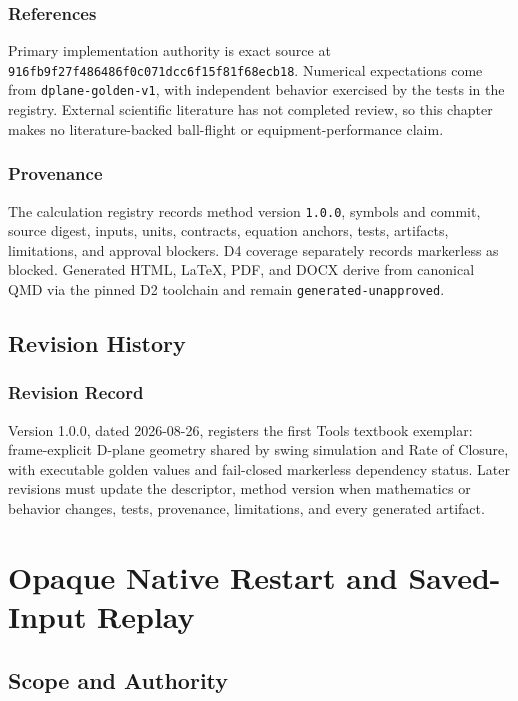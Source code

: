 \documentclass[
  american,
]{article}
\begin{document}
\subsubsection{References}\label{references-1}

Primary implementation authority is exact source at
\texttt{916fb9f27f486486f0c071dcc6f15f81f68ecb18}. Numerical
expectations come from \texttt{dplane-golden-v1}, with independent
behavior exercised by the tests in the registry. External scientific
literature has not completed review, so this chapter makes no
literature-backed ball-flight or equipment-performance claim.

\subsubsection{Provenance}\label{provenance}

The calculation registry records method version \texttt{1.0.0}, symbols
and commit, source digest, inputs, units, contracts, equation anchors,
tests, artifacts, limitations, and approval blockers. D4 coverage
separately records markerless as blocked. Generated HTML, LaTeX, PDF,
and DOCX derive from canonical QMD via the pinned D2 toolchain and
remain \texttt{generated-unapproved}.

\subsection{Revision History}\label{revision-history}

\subsubsection{Revision Record}\label{revision-record}

Version 1.0.0, dated 2026-08-26, registers the first Tools textbook
exemplar: frame-explicit D-plane geometry shared by swing simulation and
Rate of Closure, with executable golden values and fail-closed
markerless dependency status. Later revisions must update the
descriptor, method version when mathematics or behavior changes, tests,
provenance, limitations, and every generated artifact.

\section{Opaque Native Restart and Saved-Input
Replay}\label{opaque-native-restart-and-saved-input-replay}

\subsection{Scope and Authority}\label{scope-and-authority}
\end{document}
